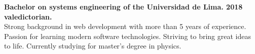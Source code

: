 

\begin{cvparagraph}

{\bfseries Bachelor on systems engineering of the Universidad de Lima. 2018 valedictorian.}\\
Strong background in web development with more than 5 years of experience. Passion for learning modern software technologies. Striving to bring great ideas to life. Currently studying for master's degree in physics.
\end{cvparagraph}
